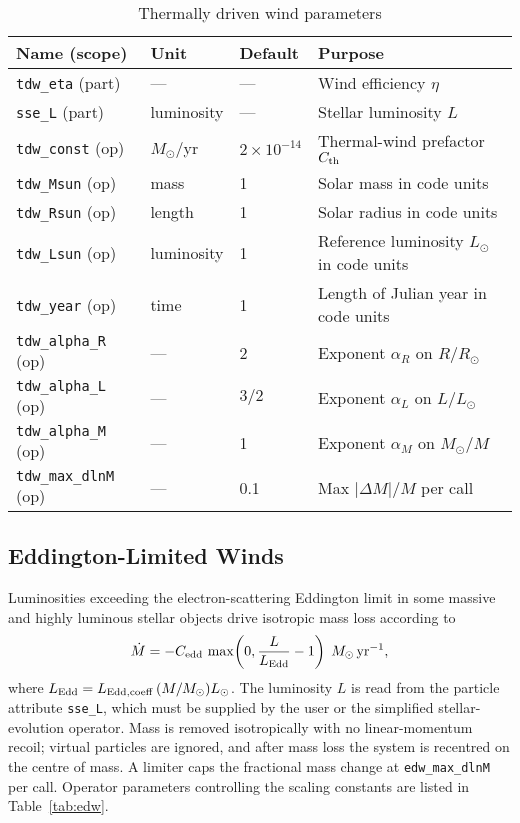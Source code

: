\documentclass[11pt]{article}
\begin{document}
\begin{table}[h]
\centering\footnotesize
\caption{Thermally driven wind parameters}
\label{tab:tdw}
\begin{tabular}{@{}llll@{}}
\toprule
Name (scope) & Unit & Default & Purpose \\
\midrule
\texttt{tdw\_eta} (part) & — & — & Wind efficiency $\eta$\\
\texttt{sse\_L}   (part) & luminosity & — & Stellar luminosity $L$\\[0.2em]
\texttt{tdw\_const} (op) & $M_\odot$/yr & $2\times10^{-14}$ & Thermal-wind prefactor $C_{\rm th}$\\
\texttt{tdw\_Msun}  (op) & mass & 1 & Solar mass in code units\\
\texttt{tdw\_Rsun}  (op) & length & 1 & Solar radius in code units\\
\texttt{tdw\_Lsun}  (op) & luminosity & 1 & Reference luminosity $L_\odot$ in code units\\
\texttt{tdw\_year}  (op) & time & 1 & Length of Julian year in code units\\
\texttt{tdw\_alpha\_R} (op) & — & 2 & Exponent $\alpha_R$ on $R/R_\odot$\\
\texttt{tdw\_alpha\_L} (op) & — & $3/2$ & Exponent $\alpha_L$ on $L/L_\odot$\\
\texttt{tdw\_alpha\_M} (op) & — & 1 & Exponent $\alpha_M$ on $M_\odot/M$\\
\texttt{tdw\_max\_dlnM} (op) & — & 0.1 & Max $|\Delta M|/M$ per call\\
\bottomrule
\end{tabular}
\end{table}

\subsection{Eddington-Limited Winds}
\label{sec:edw}

Luminosities exceeding the electron-scattering Eddington limit in some massive and highly luminous stellar objects drive isotropic
mass loss according to
\[
\dot M = -C_{\rm edd}\,\max\!\left(0,\frac{L}{L_{\rm Edd}}-1\right)
\;M_\odot\,\mathrm{yr}^{-1},
\]
where $L_{\rm Edd} = L_{\rm Edd,coeff}\,(M/M_\odot)L_\odot$. The luminosity $L$
is read from the particle attribute \texttt{sse\_L}, which must be supplied
by the user or the simplified stellar-evolution operator. Mass is removed
isotropically with no linear-momentum recoil; virtual particles are ignored,
and after mass loss the system is recentred on the centre of mass. A limiter
caps the fractional mass change at \texttt{edw\_max\_dlnM} per call. Operator
parameters controlling the scaling constants are listed in
Table~\ref{tab:edw}.
\end{document}
